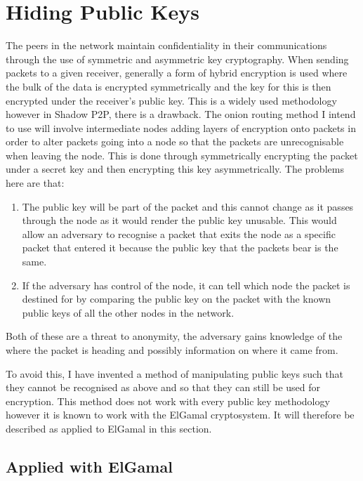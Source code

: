 \documentclass[ %
                    author={Luke Murray},
                supervisor={Dr. Simon Hollis},
                     title={Shadow Peer-to-Peer Networks},
                  subtitle={},
                    degree={MEng},
                      year={2013} ]{thesis}
\begin{document}

\section{Hiding Public Keys}

The peers in the network maintain confidentiality in their communications through the use of symmetric and asymmetric key cryptography. When sending packets to a given receiver, generally a form of hybrid encryption is used where the bulk of the data is encrypted symmetrically and the key for this is then encrypted under the receiver's public key. This is a widely used methodology %
however in Shadow P2P, there is a drawback. The onion routing method I intend to use will involve intermediate nodes adding layers of encryption onto packets in order to alter packets going into a node so that the packets are unrecognisable when leaving the node. This is done through symmetrically encrypting the packet under a secret key and then encrypting this key asymmetrically. The problems here are that:
\begin{enumerate}
\item The public key will be part of the packet and this cannot change as it passes through the node as it would render the public key unusable. This would allow an adversary to recognise a packet that exits the node as a specific packet that entered it because the public key that the packets bear is the same.
\item If the adversary has control of the node, it can tell which node the packet is destined for by comparing the public key on the packet with the known public keys of all the other nodes in the network.
\end{enumerate}
Both of these are a threat to anonymity, the adversary gains knowledge of the where the packet is heading and possibly information on where it came from.

To avoid this, I have invented a method of manipulating public keys such that they cannot be recognised as above and so that they can still be used for encryption. This method does not work with every public key methodology however it is known to work with the ElGamal cryptosystem\cite{elgamal1985public}. It will therefore be described as applied to ElGamal in this section.

\subsection{Applied with ElGamal}
\end{document}
